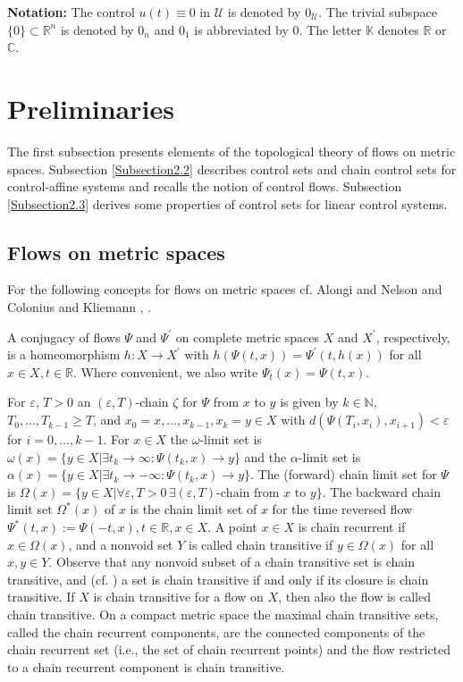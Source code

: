 \documentclass{siamltex}%
\begin{document}
\textbf{Notation:} The control $u(t)\equiv0$ in $\mathcal{U}$ is denoted by
$0_{\mathcal{U}}$. The trivial subspace $\{0\}\subset\mathbb{R}^{n}$ is
denoted by $0_{n}$ and $0_{1}$ is abbreviated by $0$. The letter $\mathbb{K}$
denotes $\mathbb{R}$ or $\mathbb{C}$.

\section{Preliminaries\label{Section2}}

The first subsection presents elements of the topological theory of flows on
metric spaces. Subsection \ref{Subsection2.2} describes control sets and chain
control sets for control-affine systems and recalls the notion of control
flows. Subsection \ref{Subsection2.3} derives some properties of control sets
for linear control systems.

\subsection{Flows on metric spaces\label{Subsection2.1}}

For the following concepts for flows on metric spaces cf. Alongi and Nelson
\cite{AlonN07} and Colonius and Kliemann \cite[Appendix B]{ColK00},
\cite{ColK14}.

A conjugacy of flows $\Psi$ and $\Psi^{\prime}$ on complete metric spaces $X$
and $X^{\prime}$, respectively, is a homeomorphism $h:X\rightarrow X^{\prime}$
with $h(\Psi(t,x))=\Psi^{\prime}(t,h(x))$ for all $x\in X,t\in\mathbb{R}$.
Where convenient, we also write $\Psi_{t}(x)=\Psi(t,x)$.

For $\varepsilon,\,T>0$ an $(\varepsilon,T)$-chain $\zeta$ for $\Psi$ from $x$
to $y$ is given by $k\in\mathbb{N}\mathbf{,}$ $T_{0},\ldots,T_{k-1}\geq T$,
and $x_{0}=x,\ldots,x_{k-1},x_{k}=y\in X$ with $d(\Psi(T_{i},x_{i}%
),x_{i+1})<\varepsilon$ for $i=0,\ldots,k-1$. For $x\in X$ the $\omega$-limit
set is $\omega(x)=\{y\in X\left\vert \exists t_{k}\rightarrow\infty:\Psi
(t_{k},x)\rightarrow y\right.  \}$ and the $\alpha$-limit set is
$\alpha(x)=\{y\in X\left\vert \exists t_{k}\rightarrow-\infty:\Psi
(t_{k},x)\rightarrow y\right.  \}$. The (forward) chain limit set for $\Psi$
is $\Omega(x)=\{y\in X\left\vert \forall\varepsilon,T>0\,\exists
(\varepsilon,T)\text{-chain from }x\text{ to }y\right.  \}$. The backward
chain limit set $\Omega^{\ast}(x)$ of $x$ is the chain limit set of $x$ for
the time reversed flow $\Psi^{\ast}(t,x):=\Psi(-t,x),t\in\mathbb{R},x\in X$. A
point $x\in X$ is chain recurrent if $x\in\Omega(x)$, and a nonvoid set $Y$ is
called chain transitive if $y\in\Omega(x)$ for all $x,y\in Y$. Observe that
any nonvoid subset of a chain transitive set is chain transitive, and (cf.
\cite[Proposition 2.7.10]{AlonN07}) a set is chain transitive if and only if
its closure is chain transitive. If $X$ is chain transitive for a flow on $X$,
then also the flow is called chain transitive. On a compact metric space the
maximal chain transitive sets, called the chain recurrent components, are the
connected components of the chain recurrent set (i.e., the set of chain
recurrent points) and the flow restricted to a chain recurrent component is
chain transitive.
\end{document}
